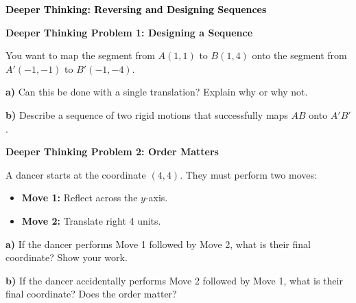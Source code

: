 \documentclass[12pt, letterpaper, fleqn]{article}
\begin{document}
\newpage

\begin{tcolorbox}[colback=customteal!20]
\large\textcolor{black}{\textbf{Deeper Thinking: Reversing and Designing Sequences}}
\end{tcolorbox}

\vspace{3mm}

\begin{tcolorbox}[colback=white!15, colframe=black, boxrule=1.5pt, arc=4mm, left=6mm, right=6mm, top=5mm, bottom=5mm]

\textbf{Deeper Thinking Problem 1: Designing a Sequence}

\medskip

\noindent
You want to map the segment from $A(1, 1)$ to $B(1, 4)$ onto the segment from $A'(-1, -1)$ to $B'(-1, -4)$.

\vspace{5mm}

\noindent
\textbf{a)} Can this be done with a single translation? Explain why or why not.

\vspace{3cm}

\noindent
\textbf{b)} Describe a sequence of two rigid motions that successfully maps $AB$ onto $A'B'$.

\vspace{3cm}

\end{tcolorbox}

\vspace{4mm}

\begin{tcolorbox}[colback=white!15, colframe=black, boxrule=1.5pt, arc=4mm, left=6mm, right=6mm, top=5mm, bottom=5mm]

\textbf{Deeper Thinking Problem 2: Order Matters}

\medskip

\noindent
A dancer starts at the coordinate $(4, 4)$. They must perform two moves:
\begin{itemize}
    \item \textbf{Move 1:} Reflect across the $y$-axis.
    \item \textbf{Move 2:} Translate right 4 units.
\end{itemize}

\vspace{5mm}

\noindent
\textbf{a)} If the dancer performs Move 1 followed by Move 2, what is their final coordinate? Show your work.

\vspace{3cm}

\noindent
\textbf{b)} If the dancer accidentally performs Move 2 followed by Move 1, what is their final coordinate? Does the order matter?

\vspace{3cm}

\end{tcolorbox}
\end{document}
